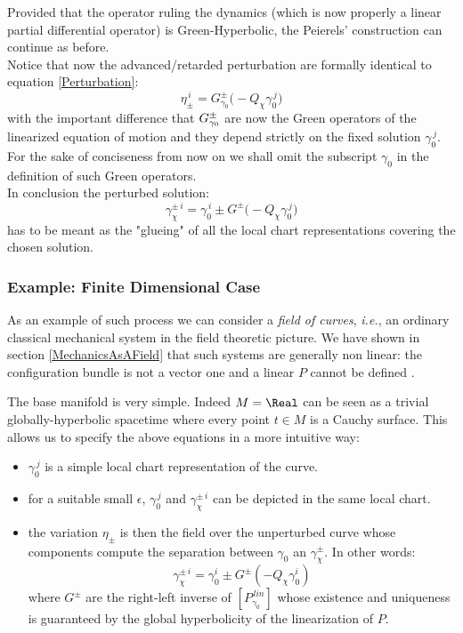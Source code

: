 \documentclass[Main]{subfiles}
\begin{document}
		\vspace{2mm}	
		Provided that the %
		 operator ruling the dynamics
		(which is now properly a linear partial differential operator) is Green-Hyperbolic, the Peierels' construction can continue as before.\\
		Notice that now the advanced/retarded perturbation are formally identical to equation \ref{Perturbation}:
		\begin{displaymath}
			\eta_\pm^{\, i} = G^\pm_{ \gamma_0} \big( - Q_\chi \gamma_0^{\, j})
		\end{displaymath}
		with the important difference that $G^\pm_{\tiny \gamma_0} $ are now the Green operators of the linearized %
		equation of motion
		and they depend strictly on the fixed solution $\gamma_0^{\, j}$.\\
		For the sake of conciseness from now on we shall omit the subscript $\gamma_0$ in the definition of such Green operators.
		\\
		In conclusion the perturbed solution:
		\begin{displaymath}
			\gamma_{\chi}^{\pm\,i} = \gamma_0^{\, i} \pm G^\pm \big( -Q_\chi \gamma_0^{\,j}\big)
		\end{displaymath}
		has to be meant as the "glueing" of all the local chart representations covering the chosen solution.

	\subsubsection{Example: Finite Dimensional Case} 
		As an example of such process we can consider a \emph{field of curves}, \textit{i.e.}, an ordinary classical mechanical system in the field theoretic picture.
		We have shown in section \ref{MechanicsAsAField} that such systems are generally non linear: the configuration bundle is not a vector one and %
		a linear $P$ cannot be defined .
			
		The base manifold is very simple. Indeed $M= \Real$ can be seen as a trivial globally-hyperbolic spacetime where every point $t\in M$ is a Cauchy surface.
		This allows us to specify the above equations in a more intuitive way:
		\begin{itemize}
			\item $\gamma_0^{\, j}$ is a simple local chart representation of the curve.
			\item for a suitable small $\epsilon$,  $\gamma_0^{\, j}$ and $\gamma_{\chi}^{\pm\,i} $ can be depicted in the same local chart.
			\item the variation $\eta_\pm$ is then the field over the unperturbed curve whose components compute the separation between $\gamma_0$ an $\gamma_{\chi}^{\pm} $. In other words:
			\begin{displaymath}
				\gamma_{\chi}^{\pm \, i} = \gamma_0^i  \pm G^\pm (-Q_\chi \gamma_0^i)
			\end{displaymath}
			where $G^\pm$ are the right-left inverse of $\left[P_{\gamma_0}^{\, lin} \right]$ whose existence and uniqueness is guaranteed by the global hyperbolicity of the linearization of $P$.
		\end{itemize}
\end{document}
